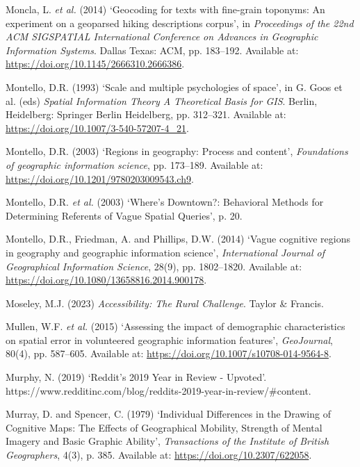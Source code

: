 \documentclass[
  letterpaper,
  11pt,
  english,
  onehalfspacing,
  headsepline]{MastersDoctoralThesis}
\newlength{\cslhangindent}
\newlength{\cslentryspacingunit} %
\newenvironment{CSLReferences}[2] %
 {%
  \setlength{\parindent}{0pt}
  \ifodd #1
  \let\oldpar\par
  \def\par{\hangindent=\cslhangindent\oldpar}
  \fi
  \setlength{\parskip}{#2\cslentryspacingunit}
 }%
 {}
\begin{document}
\begin{CSLReferences}{0}{0}
\leavevmode{}%
Moncla, L. \emph{et al.} (2014) {`Geocoding for texts with fine-grain
toponyms: An experiment on a geoparsed hiking descriptions corpus'}, in
\emph{Proceedings of the 22nd {ACM SIGSPATIAL International Conference}
on {Advances} in {Geographic Information Systems}}. {Dallas Texas}:
{ACM}, pp. 183--192. Available at:
\url{https://doi.org/10.1145/2666310.2666386}.

\leavevmode{}%
Montello, D.R. (1993) {`Scale and multiple psychologies of space'}, in
G. Goos et al. (eds) \emph{Spatial {Information Theory A Theoretical
Basis} for {GIS}}. {Berlin, Heidelberg}: {Springer Berlin Heidelberg},
pp. 312--321. Available at:
\url{https://doi.org/10.1007/3-540-57207-4_21}.

\leavevmode{}%
Montello, D.R. (2003) {`Regions in geography: {Process} and content'},
\emph{Foundations of geographic information science}, pp. 173--189.
Available at: \url{https://doi.org/10.1201/9780203009543.ch9}.

\leavevmode{}%
Montello, D.R. \emph{et al.} (2003) {`Where's {Downtown}?: {Behavioral
Methods} for {Determining Referents} of {Vague Spatial Queries}'}, p.
20.

\leavevmode{}%
Montello, D.R., Friedman, A. and Phillips, D.W. (2014) {`Vague cognitive
regions in geography and geographic information science'},
\emph{International Journal of Geographical Information Science}, 28(9),
pp. 1802--1820. Available at:
\url{https://doi.org/10.1080/13658816.2014.900178}.

\leavevmode{}%
Moseley, M.J. (2023) \emph{Accessibility: {The Rural Challenge}}.
{Taylor \& Francis}.

\leavevmode{}%
Mullen, W.F. \emph{et al.} (2015) {`Assessing the impact of demographic
characteristics on spatial error in volunteered geographic information
features'}, \emph{GeoJournal}, 80(4), pp. 587--605. Available at:
\url{https://doi.org/10.1007/s10708-014-9564-8}.

\leavevmode{}%
Murphy, N. (2019) {`Reddit's 2019 {Year} in {Review} - {Upvoted}'}.
https://www.redditinc.com/blog/reddits-2019-year-in-review/\#content.

\leavevmode{}%
Murray, D. and Spencer, C. (1979) {`Individual {Differences} in the
{Drawing} of {Cognitive Maps}: {The Effects} of {Geographical Mobility},
{Strength} of {Mental Imagery} and {Basic Graphic Ability}'},
\emph{Transactions of the Institute of British Geographers}, 4(3), p.
385. Available at: \url{https://doi.org/10.2307/622058}.


\end{CSLReferences}
\end{document}
